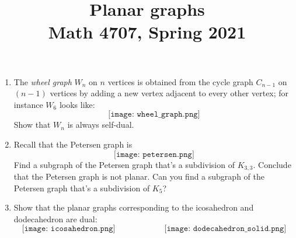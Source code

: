\documentclass[11pt]{article}
\title{Planar graphs \\ Math 4707, Spring 2021}
\date{}
\begin{document}
\maketitle

\thispagestyle{empty}

\begin{enumerate}

\item The \emph{wheel graph} $W_n$ on $n$ vertices is obtained from the cycle graph $C_{n-1}$ on $(n-1)$ vertices by adding a new vertex adjacent to every other vertex; for instance $W_6$ looks like:
\[  \texttt{[image: wheel\_graph.png]} \]
Show that $W_n$ is always self-dual.
\item Recall that the Petersen graph is
\[ \texttt{[image: petersen.png]} \]
Find a subgraph of the Petersen graph that's a subdivision of $K_{3,3}$. Conclude that the Petersen graph is not planar. Can you find a subgraph of the Petersen graph that's a subdivision of $K_5$?
\item Show that the planar graphs corresponding to the icosahedron and dodecahedron are dual:
\[ \texttt{[image: icosahedron.png]} \qquad \qquad \qquad \texttt{[image: dodecahedron\_solid.png]} \]
\end{enumerate}
\end{document}
